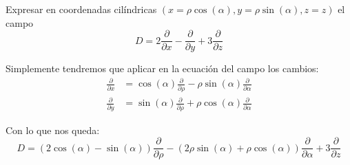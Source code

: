 \begin{problem}[7]
Expresar en coordenadas cilíndricas $(x=ρ\cos(α), y=ρ\sin(α), z=z)$ el campo
\[D= 2 \frac{\partial}{\partial x}-\frac{\partial}{\partial y}+3\frac{\partial}{\partial z}\]

\solution
\yoP

Simplemente tendremos que aplicar en la ecuación del campo los cambios:
\begin{align*}
\frac{\partial}{\partial x} &= \cos(α)\frac{\partial}{\partial ρ}-ρ\sin(α)\frac{\partial}{\partial α} \\
\frac{\partial}{\partial y} &= \sin(α)\frac{\partial}{\partial ρ}+ρ\cos(α)\frac{\partial}{\partial α}
\end{align*}

Con lo que nos queda:
\[D=(2\cos(α)-\sin(α))\frac{\partial}{\partial ρ}-(2ρ\sin(α)+ρ\cos(α))\frac{\partial}{\partial α}+3\frac{\partial}{\partial z}\]

\end{problem}


